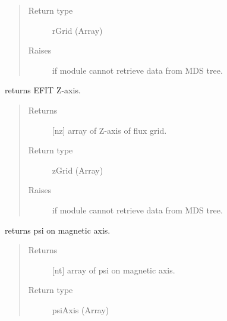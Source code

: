 \documentclass[letterpaper,10pt,english]{sphinxmanual}
\begin{document}
\begin{fulllineitems}
\begin{fulllineitems}
\begin{quote}
\begin{description}
\item[{Return type}] \leavevmode
rGrid (Array)

\item[{Raises}] \leavevmode
{} \textendash{} if module cannot retrieve data from MDS tree.

\end{description}\end{quote}

\end{fulllineitems}


\begin{fulllineitems}
\label{\detokenize{eqtools:eqtools.EFIT.EFITTree.getZGrid}}
returns EFIT Z-axis.
\begin{quote}\begin{description}
\item[{Returns}] \leavevmode
{[}nz{]} array of Z-axis of flux grid.

\item[{Return type}] \leavevmode
zGrid (Array)

\item[{Raises}] \leavevmode
{} \textendash{} if module cannot retrieve data from MDS tree.

\end{description}\end{quote}

\end{fulllineitems}


\begin{fulllineitems}
\label{\detokenize{eqtools:eqtools.EFIT.EFITTree.getFluxAxis}}
returns psi on magnetic axis.
\begin{quote}\begin{description}
\item[{Returns}] \leavevmode
{[}nt{]} array of psi on magnetic axis.

\item[{Return type}] \leavevmode
psiAxis (Array)


\end{description}
\end{quote}
\end{fulllineitems}
\end{fulllineitems}
\end{document}
